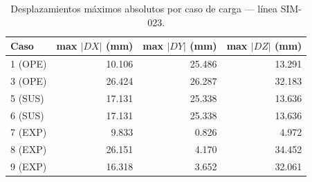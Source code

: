 \begin{table}[htbp]
  \centering
  \small
  \caption{Desplazamientos máximos absolutos por caso de carga — línea SIM-023.}
  \label{tab:desplaz-max}
  \begin{tabular}{lrrr}
    \toprule
    Caso & max $|DX|$ (\si{mm}) & max $|DY|$ (\si{mm}) & max $|DZ|$ (\si{mm}) \\
    \midrule
    1 (OPE) & 10.106 & 25.486 & 13.291 \\
    3 (OPE) & 26.424 & 26.287 & 32.183 \\
    5 (SUS) & 17.131 & 25.338 & 13.636 \\
    6 (SUS) & 17.131 & 25.338 & 13.636 \\
    7 (EXP) & 9.833 & 0.826 & 4.972 \\
    8 (EXP) & 26.151 & 4.170 & 34.452 \\
    9 (EXP) & 16.318 & 3.652 & 32.061 \\
    \bottomrule
  \end{tabular}
\end{table}

